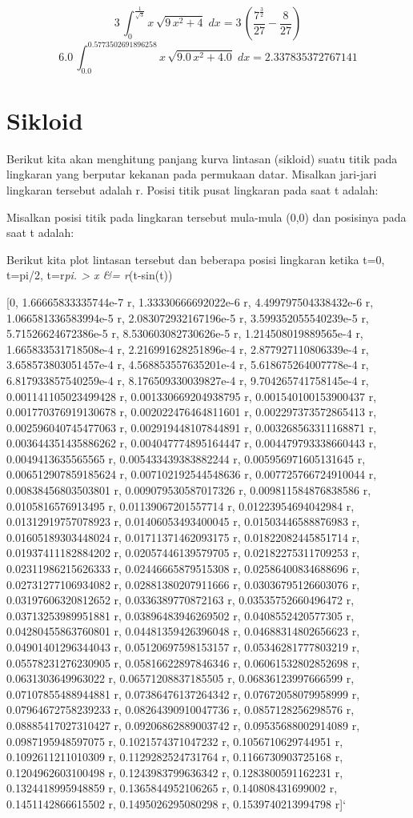 \documentclass[
]{book}
\begin{document}
\[3\,\int_{0}^{\frac{1}{\sqrt{3}}}{x\,\sqrt{9\,x^2+4}\;dx}=3\,\left(\frac{7^{\frac{3}{2}}}{27}-\frac{8}{27}\right)\] \[6.0\,\int_{0.0}^{0.5773502691896258}{x\,\sqrt{9.0\,x^2+4.0}\;dx}=2.337835372767141\]

\section{Sikloid}\label{sikloid}

Berikut kita akan menghitung panjang kurva lintasan (sikloid) suatu titik pada lingkaran yang berputar kekanan pada permukaan datar. Misalkan jari-jari lingkaran tersebut adalah r. Posisi titik pusat lingkaran pada saat t adalah:

Misalkan posisi titik pada lingkaran tersebut mula-mula (0,0) dan posisinya pada saat t adalah:

Berikut kita plot lintasan tersebut dan beberapa posisi lingkaran ketika t=0, t=pi/2, t=r\emph{pi. \textgreater{} x \&= r}(t-sin(t))

{[}0, 1.66665833335744e-7 r, 1.33330666692022e-6 r, 4.499797504338432e-6 r, 1.066581336583994e-5 r, 2.083072932167196e-5 r, 3.599352055540239e-5 r, 5.71526624672386e-5 r, 8.530603082730626e-5 r, 1.214508019889565e-4 r, 1.665833531718508e-4 r, 2.216991628251896e-4 r, 2.877927110806339e-4 r, 3.658573803051457e-4 r, 4.568853557635201e-4 r, 5.618675264007778e-4 r, 6.817933857540259e-4 r, 8.176509330039827e-4 r, 9.704265741758145e-4 r, 0.001141105023499428 r, 0.001330669204938795 r, 0.001540100153900437 r, 0.001770376919130678 r, 0.002022476464811601 r, 0.002297373572865413 r, 0.002596040745477063 r, 0.002919448107844891 r, 0.003268563311168871 r, 0.003644351435886262 r, 0.004047774895164447 r, 0.004479793338660443 r, 0.0049413635565565 r, 0.005433439383882244 r, 0.005956971605131645 r, 0.006512907859185624 r, 0.007102192544548636 r, 0.007725766724910044 r, 0.00838456803503801 r, 0.009079530587017326 r, 0.009811584876838586 r, 0.0105816576913495 r, 0.01139067201557714 r, 0.01223954694042984 r, 0.01312919757078923 r, 0.01406053493400045 r, 0.01503446588876983 r, 0.01605189303448024 r, 0.01711371462093175 r, 0.01822082445851714 r, 0.01937411182884202 r, 0.02057446139579705 r, 0.02182275311709253 r, 0.02311986215626333 r, 0.02446665879515308 r, 0.02586400834688696 r, 0.02731277106934082 r, 0.02881380207911666 r, 0.03036795126603076 r, 0.03197606320812652 r, 0.0336389770872163 r, 0.03535752660496472 r, 0.03713253989951881 r, 0.03896483946269502 r, 0.0408552420577305 r, 0.04280455863760801 r, 0.04481359426396048 r, 0.04688314802656623 r, 0.04901401296344043 r, 0.05120697598153157 r, 0.05346281777803219 r, 0.05578231276230905 r, 0.05816622897846346 r, 0.06061532802852698 r, 0.0631303649963022 r, 0.06571208837185505 r, 0.06836123997666599 r, 0.07107855488944881 r, 0.07386476137264342 r, 0.07672058079958999 r, 0.07964672758239233 r, 0.08264390910047736 r, 0.0857128256298576 r, 0.08885417027310427 r, 0.09206862889003742 r, 0.09535688002914089 r, 0.0987195948597075 r, 0.1021574371047232 r, 0.1056710629744951 r, 0.1092611211010309 r, 0.1129282524731764 r, 0.1166730903725168 r, 0.1204962603100498 r, 0.1243983799636342 r, 0.1283800591162231 r, 0.1324418995948859 r, 0.1365844952106265 r, 0.140808431699002 r, 0.1451142866615502 r, 0.1495026295080298 r, 0.1539740213994798 r{]}`
\end{document}

